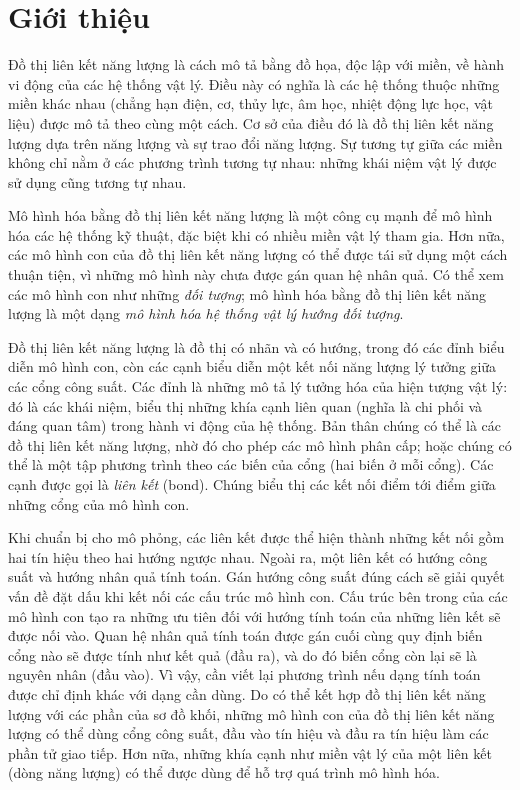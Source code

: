 \section{Giới thiệu}
Đồ thị liên kết năng lượng là cách mô tả bằng đồ họa, độc lập với miền, về hành vi động của các hệ thống vật lý. Điều này có nghĩa là các hệ thống thuộc những miền khác nhau (chẳng hạn điện, cơ, thủy lực, âm học, nhiệt động lực học, vật liệu) được mô tả theo cùng một cách. Cơ sở của điều đó là đồ thị liên kết năng lượng dựa trên năng lượng và sự trao đổi năng lượng. Sự tương tự giữa các miền không chỉ nằm ở các phương trình tương tự nhau: những khái niệm vật lý được sử dụng cũng tương tự nhau.

Mô hình hóa bằng đồ thị liên kết năng lượng là một công cụ mạnh để mô hình hóa các hệ thống kỹ thuật, đặc biệt khi có nhiều miền vật lý tham gia. Hơn nữa, các mô hình con của đồ thị liên kết năng lượng có thể được tái sử dụng một cách thuận tiện, vì những mô hình này chưa được gán quan hệ nhân quả. Có thể xem các mô hình con như những \emph{đối tượng}; mô hình hóa bằng đồ thị liên kết năng lượng là một dạng \emph{mô hình hóa hệ thống vật lý hướng đối tượng}.

Đồ thị liên kết năng lượng là đồ thị có nhãn và có hướng, trong đó các đỉnh biểu diễn mô hình con, còn các cạnh biểu diễn một kết nối năng lượng lý tưởng giữa các cổng công suất. Các đỉnh là những mô tả lý tưởng hóa của hiện tượng vật lý: đó là các khái niệm, biểu thị những khía cạnh liên quan (nghĩa là chi phối và đáng quan tâm) trong hành vi động của hệ thống. Bản thân chúng có thể là các đồ thị liên kết năng lượng, nhờ đó cho phép các mô hình phân cấp; hoặc chúng có thể là một tập
phương trình theo các biến của cổng (hai biến ở mỗi cổng). Các cạnh được gọi là \emph{liên kết} (bond). Chúng biểu thị các kết nối điểm tới điểm giữa những cổng của mô hình con.

Khi chuẩn bị cho mô phỏng, các liên kết được thể hiện thành những kết nối gồm hai tín hiệu theo hai hướng ngược nhau. Ngoài ra, một liên kết có hướng công suất và hướng nhân quả tính toán. Gán hướng công suất đúng cách sẽ giải quyết vấn đề đặt dấu khi kết nối các cấu trúc mô hình con. Cấu trúc bên trong của các mô hình con tạo ra những ưu tiên đối với hướng tính toán của những liên kết sẽ được nối vào. Quan hệ nhân quả tính toán được gán cuối cùng quy định biến cổng nào sẽ được tính như kết quả (đầu ra), và do đó biến cổng còn lại sẽ là nguyên nhân (đầu vào). Vì vậy, cần viết lại phương trình nếu dạng tính toán được chỉ định khác với dạng cần dùng. Do có thể kết hợp đồ thị liên kết năng lượng với các phần của sơ đồ khối, những mô hình con của đồ thị liên kết năng lượng có thể dùng cổng công suất, đầu vào tín hiệu và đầu ra tín hiệu làm các phần tử giao tiếp. Hơn nữa, những khía cạnh như miền vật lý của một liên kết (dòng năng lượng) có thể được dùng để hỗ trợ quá trình mô hình hóa.

